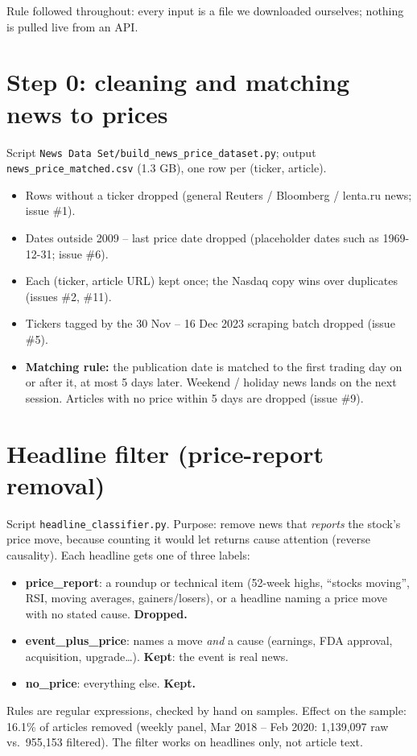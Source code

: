 \documentclass[11pt]{article}
\newcommand{\var}[1]{\texttt{#1}}
\begin{document}
Rule followed throughout: every input is a file we downloaded ourselves; nothing is pulled live from an API.

\section{Step 0: cleaning and matching news to prices}

Script \var{News Data Set/build\_news\_price\_dataset.py}; output \var{news\_price\_matched.csv} (1.3 GB), one row per (ticker, article).
\begin{itemize}
  \item Rows without a ticker dropped (general Reuters / Bloomberg / lenta.ru news; issue \#1).
  \item Dates outside 2009 -- last price date dropped (placeholder dates such as 1969-12-31; issue \#6).
  \item Each (ticker, article URL) kept once; the Nasdaq copy wins over duplicates (issues \#2, \#11).
  \item Tickers tagged by the 30 Nov -- 16 Dec 2023 scraping batch dropped (issue \#5).
  \item \textbf{Matching rule:} the publication date is matched to the first trading day on or after it, at most 5 days later. Weekend / holiday news lands on the next session. Articles with no price within 5 days are dropped (issue \#9).
\end{itemize}

\section{Headline filter (price-report removal)}

Script \var{headline\_classifier.py}. Purpose: remove news that \emph{reports} the stock's price move, because counting it would let returns cause attention (reverse causality). Each headline gets one of three labels:
\begin{itemize}
  \item \textbf{price\_report}: a roundup or technical item (52-week highs, ``stocks moving'', RSI, moving averages, gainers/losers), or a headline naming a price move with no stated cause. \textbf{Dropped.}
  \item \textbf{event\_plus\_price}: names a move \emph{and} a cause (earnings, FDA approval, acquisition, upgrade\ldots). \textbf{Kept}: the event is real news.
  \item \textbf{no\_price}: everything else. \textbf{Kept.}
\end{itemize}
Rules are regular expressions, checked by hand on samples. Effect on the sample: 16.1\% of articles removed (weekly panel, Mar 2018 -- Feb 2020: 1,139,097 raw vs.\ 955,153 filtered). The filter works on headlines only, not article text.
\end{document}
